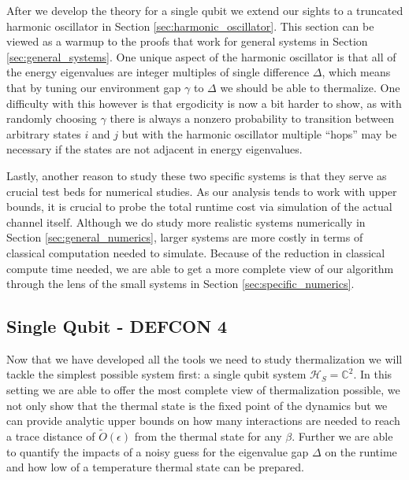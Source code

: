 \documentclass{article}
\newcommand{\hilb}{\mathcal{H}}
\begin{document}
After we develop the theory for a single qubit we extend our sights to a truncated harmonic oscillator in Section \ref{sec:harmonic_oscillator}. This section can be viewed as a warmup to the proofs that work for general systems in Section \ref{sec:general_systems}. One unique aspect of the harmonic oscillator is that all of the energy eigenvalues are integer multiples of single difference $\Delta$, which means that by tuning our environment gap $\gamma$ to $\Delta$ we should be able to thermalize. One difficulty with this however is that ergodicity is now a bit harder to show, as with randomly choosing $\gamma$ there is always a nonzero probability to transition between arbitrary states $i$ and $j$ but with the harmonic oscillator multiple ``hops'' may be necessary if the states are not adjacent in energy eigenvalues.

Lastly, another reason to study these two specific systems is that they serve as crucial test beds for numerical studies. As our analysis tends to work with upper bounds, it is crucial to probe the total runtime cost via simulation of the actual channel itself. Although we do study more realistic systems numerically in Section \ref{sec:general_numerics}, larger systems are more costly in terms of classical computation needed to simulate. Because of the reduction in classical compute time needed, we are able to get a more complete view of our algorithm through the lens of the small systems in Section \ref{sec:specific_numerics}.

\subsection{Single Qubit - DEFCON 4} \label{sec:single_qubit}
Now that we have developed all the tools we need to study thermalization we will tackle the simplest possible system first: a single qubit system $\hilb_S = \mathbb{C}^2$. In this setting we are able to offer the most complete view of thermalization possible, we not only show that the thermal state is the fixed point of the dynamics but we can provide analytic upper bounds on how many interactions are needed to reach a trace distance of $\widetilde{O}(\epsilon)$ from the thermal state for any $\beta$. Further we are able to quantify the impacts of a noisy guess for the eigenvalue gap $\Delta$ on the runtime and how low of a temperature thermal state can be prepared. 
\end{document}
